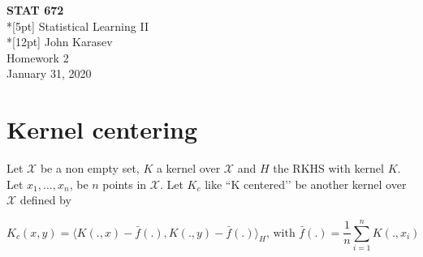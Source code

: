 \documentclass{article}
\begin{document}
\thispagestyle{empty}
\begin{center}
    {\large\bf STAT 672}    \\*[5pt] {\Large Statistical Learning II}
    \\*[12pt] {\large John Karasev}
    \\ {\large Homework 2}
    \\ {\large January 31, 2020}
\end{center}
\section{Kernel centering}

Let $\mathcal{X}$ be a non empty set, $K$ a kernel over $\mathcal{X}$ and $H$ the 
RKHS with kernel $K$. Let $x_1,\ldots,x_n$, be $n$ points in $\mathcal{X}$.
Let $K_c$ like ``K centered\rq\rq{} be another kernel over $\mathcal{X}$ defined by 

\begin{equation}
    K_c(x,y)=\langle K(.,x)- \bar{f}(.), K(.,y)-\bar{f}(.)\rangle_H 
    \mbox{, with } \bar{f}(.)=\frac{1}{n}\sum_{i=1}^n K(.,x_i)
\end{equation}
\end{document}
